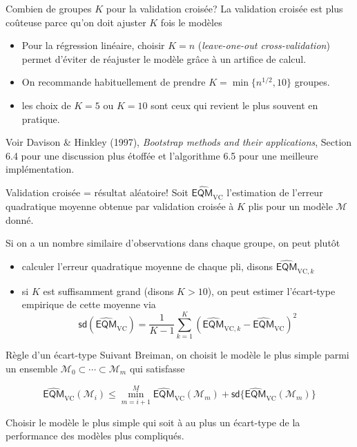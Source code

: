 \documentclass[
  ignorenonframetext,
]{beamer}
\providecommand{\tightlist}{%
  \setlength{\itemsep}{0pt}\setlength{\parskip}{0pt}}\usepackage{longtable,booktabs,array}
\begin{document}
\begin{frame}{Combien de groupes \(K\) pour la validation croisée?}
\protect\hypertarget{combien-de-groupes-k-pour-la-validation-croisuxe9e}{}
La validation croisée est plus coûteuse parce qu'on doit ajuster \(K\)
fois le modèles

\begin{itemize}
\tightlist
\item
  Pour la régression linéaire, choisir \(K=n\) (\emph{leave-one-out
  cross-validation}) permet d'éviter de réajuster le modèle grâce à un
  artifice de calcul.
\item
  On recommande habituellement de prendre \(K=\min\{n^{1/2}, 10\}\)
  groupes.
\item
  les choix de \(K=5\) ou \(K=10\) sont ceux qui revient le plus souvent
  en pratique.
\end{itemize}

\footnotesize

Voir Davison \& Hinkley (1997), \emph{Bootstrap methods and their
applications}, Section 6.4 pour une discussion plus étoffée et
l'algorithme 6.5 pour une meilleure implémentation.

\normalsize
\end{frame}

\begin{frame}{Validation croisée = résultat aléatoire!}
\protect\hypertarget{validation-croisuxe9e-ruxe9sultat-aluxe9atoire}{}
Soit \(\widehat{\mathsf{EQM}}_{\text{VC}}\) l'estimation de l'erreur
quadratique moyenne obtenue par validation croisée à \(K\) plis pour un
modèle \(\mathcal{M}\) donné.

Si on a un nombre similaire d'observations dans chaque groupe, on peut
plutôt

\begin{itemize}
\tightlist
\item
  calculer l'erreur quadratique moyenne de chaque pli, disons
  \(\widehat{\mathsf{EQM}}_{\text{VC}, k}\)
\item
  si \(K\) est suffisamment grand (disons \(K>10\)), on peut estimer
  l'écart-type empirique de cette moyenne via
  \[ \mathsf{sd}(\widehat{\mathsf{EQM}}_{\text{VC}}) = \frac{1}{K-1} \sum_{k=1}^{K} (\widehat{\mathsf{EQM}}_{\text{VC}, k}-\widehat{\mathsf{EQM}}_{\text{VC}})^2\]
\end{itemize}
\end{frame}

\begin{frame}{Règle d'un écart-type}
\protect\hypertarget{ruxe8gle-dun-uxe9cart-type}{}
Suivant Breiman, on choisit le modèle le plus simple parmi un ensemble
\(\mathcal{M}_0 \subset\cdots \subset \mathcal{M}_m\) qui satisfasse

\[\widehat{\mathsf{EQM}}_{\text{VC}}(\mathcal{M}_i) \leq \min_{m = i+1}^M \widehat{\mathsf{EQM}}_{\text{VC}}(\mathcal{M}_m) + \mathsf{sd}\{\widehat{\mathsf{EQM}}_{\text{VC}}(\mathcal{M}_m)\}\]

Choisir le modèle le plus simple qui soit à au plus un écart-type de la
performance des modèles plus compliqués.
\end{frame}
\end{document}
